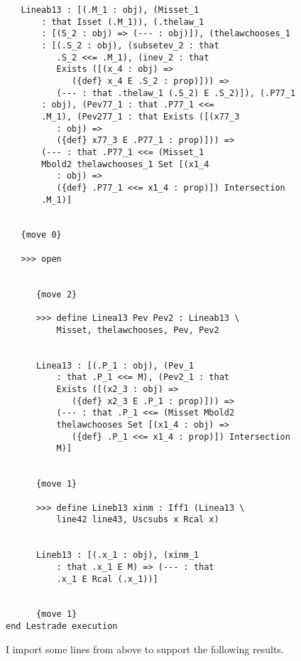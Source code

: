 \documentclass[12pt]{article}
\begin{document}
\begin{verbatim}
   Lineab13 : [(.M_1 : obj), (Misset_1 
       : that Isset (.M_1)), (.thelaw_1 
       : [(S_2 : obj) => (--- : obj)]), (thelawchooses_1 
       : [(.S_2 : obj), (subsetev_2 : that 
          .S_2 <<= .M_1), (inev_2 : that 
          Exists ([(x_4 : obj) => 
             ({def} x_4 E .S_2 : prop)])) => 
          (--- : that .thelaw_1 (.S_2) E .S_2)]), (.P77_1 
       : obj), (Pev77_1 : that .P77_1 <<= 
       .M_1), (Pev277_1 : that Exists ([(x77_3 
          : obj) => 
          ({def} x77_3 E .P77_1 : prop)])) => 
       (--- : that .P77_1 <<= (Misset_1 
       Mbold2 thelawchooses_1 Set [(x1_4 
          : obj) => 
          ({def} .P77_1 <<= x1_4 : prop)]) Intersection 
       .M_1)]


   {move 0}

   >>> open


      {move 2}

      >>> define Linea13 Pev Pev2 : Lineab13 \
          Misset, thelawchooses, Pev, Pev2


      Linea13 : [(.P_1 : obj), (Pev_1 
          : that .P_1 <<= M), (Pev2_1 : that 
          Exists ([(x2_3 : obj) => 
             ({def} x2_3 E .P_1 : prop)])) => 
          (--- : that .P_1 <<= (Misset Mbold2 
          thelawchooses Set [(x1_4 : obj) => 
             ({def} .P_1 <<= x1_4 : prop)]) Intersection 
          M)]


      {move 1}

      >>> define Lineb13 xinm : Iff1 (Linea13 \
          line42 line43, Uscsubs x Rcal x)


      Lineb13 : [(.x_1 : obj), (xinm_1 
          : that .x_1 E M) => (--- : that 
          .x_1 E Rcal (.x_1))]


      {move 1}
end Lestrade execution
\end{verbatim}

I import some lines from above to support the following results.
\end{document}
